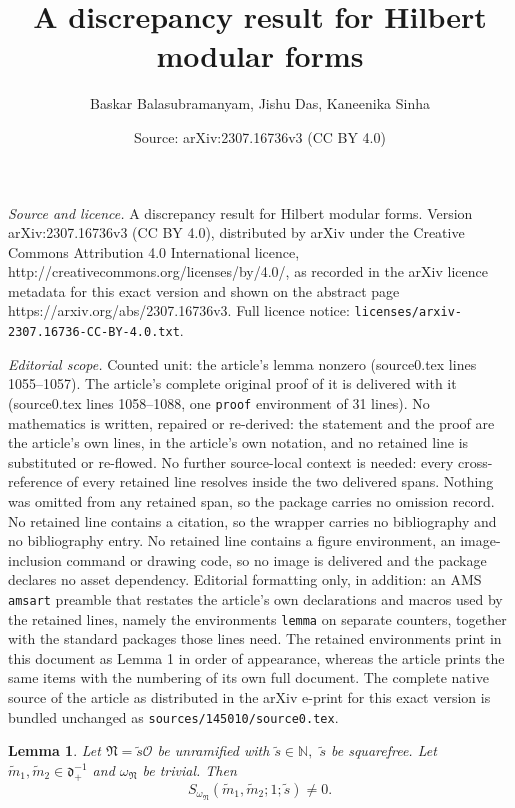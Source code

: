 \documentclass[10pt,a4paper]{amsart}
\title{A discrepancy result for Hilbert modular forms}
\author{Baskar Balasubramanyam, Jishu Das, Kaneenika Sinha}
\date{Source: arXiv:2307.16736v3 (CC BY 4.0)}
\newtheorem{lemma}{Lemma}
\begin{document}
\maketitle

\noindent\emph{Source and licence.} A discrepancy result for Hilbert modular forms. Version arXiv:2307.16736v3 (CC BY 4.0), distributed by arXiv under the Creative Commons Attribution 4.0 International licence, http://creativecommons.org/licenses/by/4.0/, as recorded in the arXiv licence metadata for this exact version and shown on the abstract page https://arxiv.org/abs/2307.16736v3. Full licence notice: \texttt{licenses/arxiv-2307.16736-CC-BY-4.0.txt}.\par\smallskip

\noindent\textit{Editorial scope.} Counted unit: the article's lemma nonzero (source0.tex lines 1055--1057). The article's complete original proof of it is delivered with it (source0.tex lines 1058--1088, one \texttt{proof} environment of 31 lines). No mathematics is written, repaired or re-derived: the statement and the proof are the article's own lines, in the article's own notation, and no retained line is substituted or re-flowed.  No further source-local context is needed: every cross-reference of every retained line resolves inside the two delivered spans.  Nothing was omitted from any retained span, so the package carries no omission record.  No retained line contains a citation, so the wrapper carries no bibliography and no bibliography entry.  No retained line contains a figure environment, an image-inclusion command or drawing code, so no image is delivered and the package declares no asset dependency.  Editorial formatting only, in addition: an AMS \texttt{amsart} preamble that restates the article's own declarations and macros used by the retained lines, namely the environments \texttt{lemma} on separate counters, together with the standard packages those lines need.  The retained environments print in this document as Lemma 1 in order of appearance, whereas the article prints the same items with the numbering of its own full document.  The complete native source of the article as distributed in the arXiv e-print for this exact version is bundled unchanged as \texttt{sources/145010/source0.tex}.
 \begin{lemma}\label{Kloosterman sum nonzero}
 Let  $\mathfrak{N}=\tilde{s}\mathcal{O}$ be unramified with $\tilde{s}\in \mathbb{N},$  $\tilde{s}$ be squarefree. Let $\tilde{m}_1,\tilde{m}_2 \in \mathfrak{d}^{-1}_+$ and  $\omega_{\mathfrak{N}}$  be trivial. Then   $$S_{\omega_\mathfrak{N}} (\tilde{m}_1,\tilde{m}_2;1;\tilde{s})\neq 0.$$
 \end{lemma}
\end{document}
